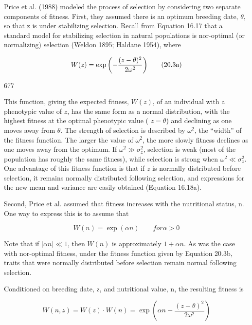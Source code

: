 \documentclass{article}
\begin{document}
Price et al. (1988) modeled the process of selection by considering two separate components of fitness. First, they assumed there is an optimum breeding date,  $ \theta $, so that z is under stabilizing selection. Recall from Equation 16.17 that a standard model for stabilizing selection in natural populations is nor-optimal (or normalizing) selection (Weldon 1895; Haldane 1954), where

\begin{equation}
\begin{align*}W(z)=\exp\left(-{(z-\theta)^2\over2\omega^2}\right)\end{align*}
\tag{20.3a}
\label{eq:20_3a}
\end{equation}

677

This function, giving the expected fitness,  $ W(z) $, of an individual with a phenotypic value of  $ z $, has the same form as a normal distribution, with the highest fitness at the optimal phenotypic value ( $ z = \theta $) and declining as one moves away from  $ \theta $. The strength of selection is described by  $ \omega^2 $, the “width” of the fitness function. The larger the value of  $ \omega^2 $, the more slowly fitness declines as one moves away from the optimum. If  $ \omega^2 \gg \sigma_z^2 $, selection is weak (most of the population has roughly the same fitness), while selection is strong when  $ \omega^2 \ll \sigma_z^2 $. One advantage of this fitness function is that if  $ z $ is normally distributed before selection, it remains normally distributed following selection, and expressions for the new mean and variance are easily obtained (Equation 16.18a).

Second, Price et al. assumed that fitness increases with the nutritional status, n. One way to express this is to assume that

\begin{equation}
W(n)=\exp(\alpha n)\qquad for\alpha>0
\tag{20.3b}
\label{eq:20_3b}
\end{equation}

Note that if  $ |\alpha n| \ll 1 $, then  $ W(n) $ is approximately  $ 1 + \alpha n $. As was the case with nor-optimal fitness, under the fitness function given by Equation 20.3b, traits that were normally distributed before selection remain normal following selection.

Conditioned on breeding date, z, and nutritional value, n, the resulting fitness is

\begin{equation}
W(n,z)=W(z)\cdot W(n)=\exp\left(\alpha n-\frac{(z-\theta)^{2}}{2\omega^{2}}\right)
\tag{20.4a}
\label{eq:20_4a}
\end{equation}
\end{document}

